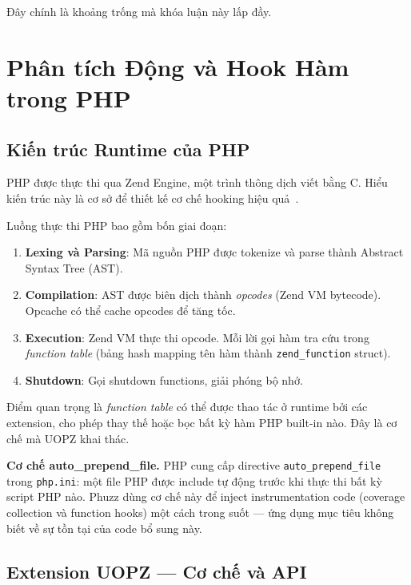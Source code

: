Đây chính là khoảng trống mà khóa luận này lấp đầy.

\section{Phân tích Động và Hook Hàm trong PHP}
\label{sec:hooking}

\subsection{Kiến trúc Runtime của PHP}
\label{subsec:zend-engine}

PHP được thực thi qua Zend Engine, một trình thông dịch viết bằng C. Hiểu
kiến trúc này là cơ sở để thiết kế cơ chế hooking hiệu quả~\cite{phpgroup2023history}.

Luồng thực thi PHP bao gồm bốn giai đoạn:
\begin{enumerate}
    \item \textbf{Lexing và Parsing}: Mã nguồn PHP được tokenize và parse
    thành Abstract Syntax Tree (AST).
    \item \textbf{Compilation}: AST được biên dịch thành \emph{opcodes}
    (Zend VM bytecode). Opcache có thể cache opcodes để tăng tốc.
    \item \textbf{Execution}: Zend VM thực thi opcode. Mỗi lời gọi hàm tra
    cứu trong \emph{function table} (bảng hash mapping tên hàm thành
    \texttt{zend\_function} struct).
    \item \textbf{Shutdown}: Gọi shutdown functions, giải phóng bộ nhớ.
\end{enumerate}

Điểm quan trọng là \emph{function table} có thể được thao tác ở runtime bởi
các extension, cho phép thay thế hoặc bọc bất kỳ hàm PHP built-in nào. Đây
là cơ chế mà UOPZ khai thác.

\textbf{Cơ chế auto\_prepend\_file.} PHP cung cấp directive
\texttt{auto\_prepend\_file} trong \texttt{php.ini}: một file PHP được include
tự động trước khi thực thi bất kỳ script PHP nào. Phuzz dùng cơ chế này để
inject instrumentation code (coverage collection và function hooks) một cách
trong suốt --- ứng dụng mục tiêu không biết về sự tồn tại của code bổ sung
này.

\subsection{Extension UOPZ --- Cơ chế và API}
\label{subsec:uopz}

